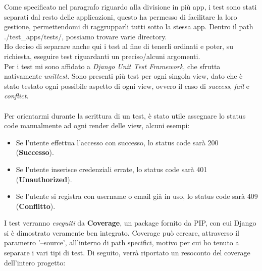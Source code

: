 \documentclass[12pt]{article}
\begin{document}
	\pagebreak
	
	
	
	\noindent Come specificato nel paragrafo riguardo alla divisione in più app, i test sono stati separati dal resto delle applicazioni, questo ha permesso di facilitare la loro gestione, permettendomi di raggrupparli tutti sotto la stessa app. Dentro il path ./test\_apps/tests/, possiamo trovare varie directory. \\Ho deciso di separare anche qui i test al fine di tenerli ordinati e poter, su richiesta, eseguire test riguardanti un preciso/alcuni argomenti. \\
	Per i test mi sono affidato a \textit{Django Unit Test Framework}, che sfrutta nativamente \textit{unittest}.
	Sono presenti più test per ogni singola view, dato che è stato testato ogni possibile aspetto di ogni view, ovvero il caso di \textit{success}, \textit{fail} e \textit{conflict}. \\ \\
	Per orientarmi durante la scrittura di un test, è stato utile assegnare lo status code manualmente ad ogni render delle view, alcuni esempi:
	\begin{itemize}
		\item Se l'utente effettua l'accesso con successo, lo status code sarà 200 (\textbf{Successo}).
		\item Se l'utente inserisce credenziali errate, lo status code sarà 401 (\textbf{Unauthorized}).
		\item Se l'utente si registra con username o email già in uso, lo status code sarà 409 (\textbf{Conflitto}).
	\end{itemize}

	\noindent I test verranno \textit{eseguiti} da \textbf{Coverage}, un package fornito da PIP, con cui Django si è dimostrato veramente ben integrato. Coverage può cercare, attraverso il parametro '--source', all'interno di path specifici, motivo per cui ho tenuto a separare i vari tipi di test. Di seguito, verrà riportato un resoconto del coverage dell'intero progetto:
	
\end{document}
